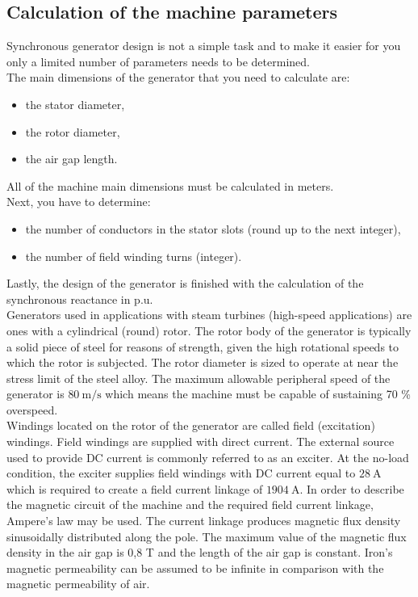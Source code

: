 \documentclass[class=article, crop=false]{standalone}
\begin{document}
\subsection{Calculation of the machine parameters}
Synchronous generator design is not a simple task and to make it easier for you only a limited  number of parameters needs to be determined. 
\\The main dimensions of the generator that you need to calculate are:
\begin{itemize}
    \item the stator diameter,
    \item the rotor diameter,
    \item the air gap length.
\end{itemize}
All of the machine main dimensions must be calculated in meters.
\\Next, you have to determine:
\begin{itemize}
    \item the number of conductors in the stator slots (round up to the next integer),
    \item the number of field winding turns (integer).
\end{itemize} 
Lastly, the design of the generator is finished with the calculation of the synchronous reactance in p.u. 
\\Generators used in applications with steam turbines (high-speed applications) are ones with a cylindrical (round) rotor. The rotor body of the generator is typically a solid piece of steel for reasons of strength, given the high rotational speeds to which the rotor is subjected. The rotor diameter is sized to operate at near the stress limit of the steel alloy. The maximum allowable peripheral speed of the generator is $80\ \mathrm{m/s}$ which means the machine must be capable of sustaining 70 \% overspeed. 
\\Windings located on the rotor of the generator are called field (excitation) windings. Field windings are supplied with direct current. The external source used to provide DC current is commonly referred to as an exciter. At the no-load condition, the exciter supplies field windings with DC current equal to $28\ \mathrm{A}$ which is required to create a field current linkage of $1904\ \mathrm{A}$. In order to describe the magnetic circuit of the machine and the required field current linkage, Ampere's law may be used. The current linkage produces magnetic flux density sinusoidally distributed along the pole. The maximum value of the magnetic flux density in the air gap is 0,8 T and the length of the air gap is constant. Iron's magnetic permeability can be assumed to be infinite in comparison with the magnetic permeability of air. 
\end{document}
